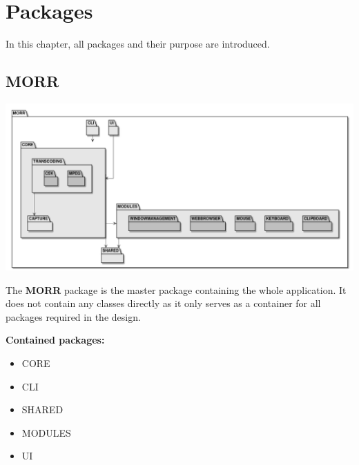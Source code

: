 \chapter{Packages}
\label{ch:package}
\newenvironment{packclass}[0]{\textbf{Contained classes:} \begin{itemize}
}{\end{itemize}}
\newenvironment{packenum}[0]{\textbf{Contained enums:} \begin{itemize}
}{\end{itemize}}
\newenvironment{packif}[0]{\textbf{Contained interfaces:} \begin{itemize}
}{\end{itemize}}
\newenvironment{packpack}[0]{\textbf{Contained packages:} \begin{itemize}
}{\end{itemize}}
\newcommand{\packobj}[1]{\item #1}
\newcommand{\abstract}[1]{\textit{abstract} #1}

In this chapter, all packages and their purpose are introduced.

\section{MORR}

\begin{center}
    \includegraphics[width=1.0\textwidth]{resources/Packages/AllPackages.png}
\end{center}

The \textbf{MORR} package is the master package containing the whole application. It does not contain any classes directly as it only serves as a container for all packages required in the design.

\begin{packpack}
\packobj{CORE}
\packobj{CLI}
\packobj{SHARED}
\packobj{MODULES}
\packobj{UI}
\end{packpack}

